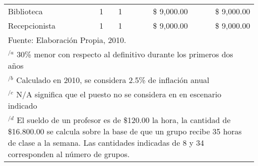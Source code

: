 \begin{table}[h]
\begin{tabular}{l|c|c|r|r}
        Biblioteca                       & 1 &  1 & \$  9,000.00 & \$  9,000.00 \\
        Recepcionista                    & 1 &  1 & \$  9,000.00 & \$  9,000.00 \\
        \hline
        \multicolumn{5}{l}{\footnotesize Fuente: Elaboración Propia, 2010.} \\
        \multicolumn{5}{p{5.5in}}{$^{/a}$ 30\% menor con respecto al definitivo durante los primeros dos años} \\
        \multicolumn{5}{p{5.5in}}{$^{/b}$ Calculado en 2010, se considera 2.5\% de inflación anual} \\
        \multicolumn{5}{p{5.5in}}{$^{/c}$ N/A significa que el puesto no se considera en en escenario indicado} \\
        \multicolumn{5}{p{5.5in}}{$^{/d}$ El sueldo de un profesor es de \$120.00 la hora, la cantidad de \$16.800.00 se calcula sobre la base de que un grupo recibe 35 horas de clase a la semana. Las cantidades indicadas de 8 y 34 corresponden al número de grupos.}
    \end{tabular}
\end{table}
